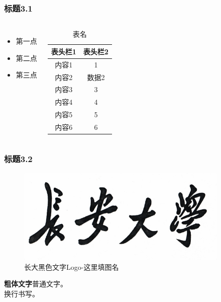 \documentclass[10pt,aspectratio=169,mathserif]{beamer}
\begin{document}
	\begin{frame}
		\frametitle{\textbf{标题3.1}}
		\begin{columns}
			\footnotesize
			\begin{itemize}
				\item 第一点
				\item 第二点
				\item 第三点
			\end{itemize}
			
			\begin{table}%
				\caption{表名}
				\label{table1}
				\centering
				\footnotesize
				\begin{tabular}{|c|c|}%
					\hline
					\textbf{表头栏1}           & \textbf{表头栏2}\\
					\hline
					内容1    				     &1\\
					\hline
					内容2                      &数据2\\
					\hline
					内容3                      &3\\
					\hline
					内容4                      &4\\
					\hline
					内容5                      &5\\
					\hline
					内容6                      &6\\
					\hline
				\end{tabular}
			\end{table}
		\end{columns}
		
	\end{frame}

	\begin{frame}
		\frametitle{\textbf{标题3.2}}
		\begin{figure}[!t]
			\centering
			\includegraphics[width=4in]{figures/D_logo.jpg}
			\caption{长大黑色文字Logo-这里填图名}
			\label{figure4}
		\end{figure}
		\textbf{粗体文字}普通文字。\\
		换行书写。
	\end{frame}
\end{document}
